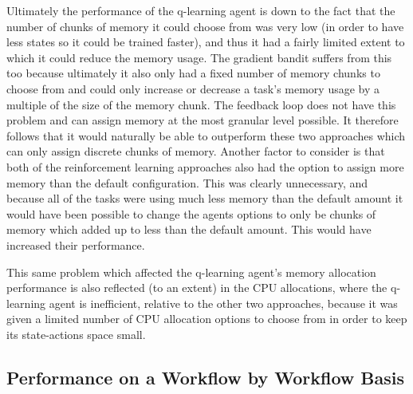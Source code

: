 Ultimately the performance of the q-learning agent is down to the fact that the number of chunks of memory it could choose from was very low (in order to have less states so it could be trained faster), and thus it had a fairly limited extent to which it could reduce the memory usage. The gradient bandit suffers from this too because ultimately it also only had a fixed number of memory chunks to choose from and could only increase or decrease a task’s memory usage by a multiple of the size of the memory chunk. The feedback loop does not have this problem and can assign memory at the most granular level possible. It therefore follows that it would naturally be able to outperform these two approaches which can only assign discrete chunks of memory. Another factor to consider is that both of the reinforcement learning approaches also had the option to assign more memory than the default configuration. This was clearly unnecessary, and because all of the tasks were using much less memory than the default amount it would have been possible to change the agents options to only be chunks of memory which added up to less than the default amount. This would have increased their performance. 

This same problem which affected the q-learning agent’s memory allocation performance is also reflected (to an extent) in the CPU allocations, where the q-learning agent is inefficient, relative to the other two approaches, because it was given a limited number of CPU allocation options to choose from in order to keep its state-actions space small. 

\subsection{Performance on a Workflow by Workflow Basis}
\label{sub:per_wf}


